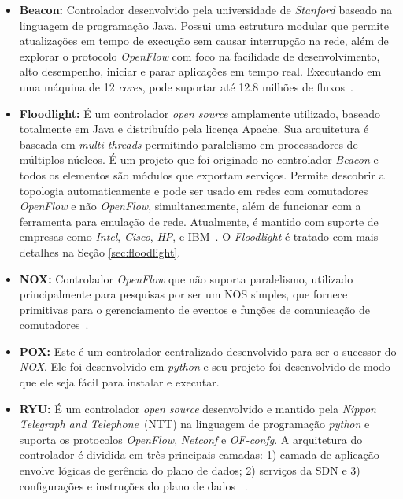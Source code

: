 \begin{itemize}
	\item \textbf{Beacon:} Controlador desenvolvido pela universidade de \textit{Stanford}  baseado na linguagem de programação  Java. Possui uma estrutura modular que permite atualizações em tempo de execução sem causar interrupção na rede, além de explorar o protocolo \textit{OpenFlow} com foco na facilidade de desenvolvimento, alto desempenho, iniciar e parar aplicações em tempo real. Executando em uma máquina de 12 \textit{cores}, pode suportar até 12.8 milhões de fluxos~\cite{beacon2013}.
   	\item \textbf{Floodlight:} É um controlador \textit{open source} amplamente utilizado, baseado totalmente em Java e distribuído pela licença Apache. Sua arquitetura é baseada em \textit{multi-threads} permitindo paralelismo em processadores de múltiplos núcleos. É um projeto que foi originado no controlador \textit{Beacon} e todos os elementos são módulos que exportam serviços. Permite descobrir a topologia automaticamente e pode ser usado em redes com comutadores \textit{OpenFlow} e não \textit{OpenFlow}, simultaneamente, além de funcionar com a ferramenta para emulação de rede. Atualmente, é mantido com suporte de empresas como \textit{Intel}, \textit{Cisco}, \textit{HP}, e IBM~\cite{floodlight2012}. O \textit{Floodlight} é tratado com mais detalhes na Seção \ref{sec:floodlight}.
    \item \textbf{NOX:} Controlador \textit{OpenFlow} que não suporta paralelismo, utilizado principalmente para pesquisas por ser um NOS simples, que fornece primitivas para o gerenciamento de eventos e funções de comunicação de comutadores~\cite{nox2008}.
    \item \textbf{POX:} Este é um controlador centralizado desenvolvido para ser o sucessor do \textit{NOX}. Ele foi desenvolvido em \textit{python} e seu projeto foi desenvolvido de modo que ele seja fácil para instalar e executar. 
    \item \textbf{RYU:} É um controlador \textit{open source} desenvolvido e mantido pela \textit{Nippon Telegraph and Telephone}~(NTT) na linguagem de programação \textit{python} e suporta os protocolos  \textit{OpenFlow}, \textit{Netconf} e \textit{OF-confg}. A arquitetura do controlador é dividida em três principais camadas: 1) camada de aplicação envolve lógicas de gerência do plano de dados; 2) serviços da SDN e 3) configurações e instruções do plano de dados ~\cite{ryu}.
\end{itemize}

